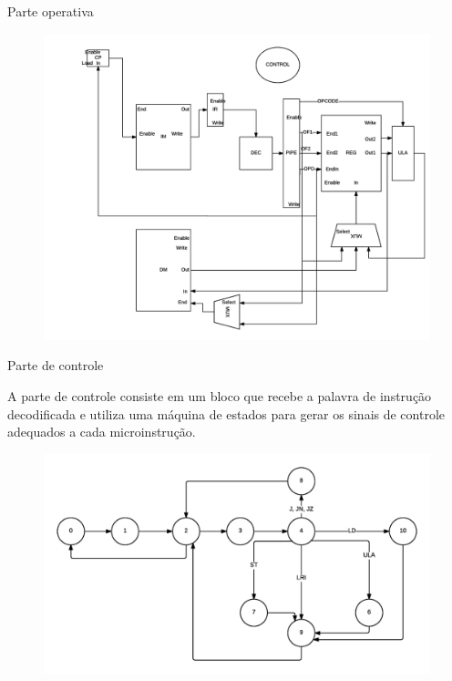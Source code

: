 \documentclass{beamer}
\begin{document}
		\begin{frame}{Parte operativa}
			\begin{figure}[H]
				\centering
				\includegraphics[scale=0.4]{img/procdiag}
			\end{figure}
		\end{frame}

		\begin{frame}{Parte de controle}

			{\footnotesize
				A parte de controle consiste em um bloco que recebe a palavra de instrução decodificada
			e utiliza uma máquina de estados para gerar os sinais de controle adequados
			a cada microinstrução. 
			}
			\begin{figure}[H]
				\centering
				\includegraphics[scale=0.5]{img/statediag}
			\end{figure}

		\end{frame}
\end{document}
